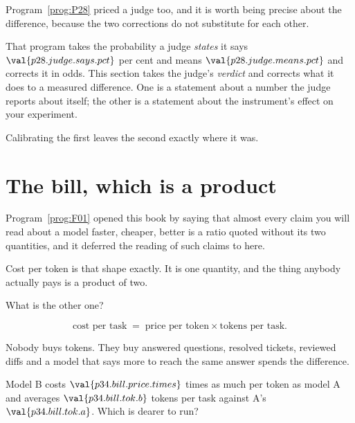 \begin{fr}
Program~\ref{prog:P28} priced a judge too, and it is worth being precise
about the difference, because the two corrections do not substitute for each
other.

That program takes the probability a judge \emph{states} \dash{} it says
$\val{p28.judge.says.pct}$ per cent and means $\val{p28.judge.means.pct}$
\dash{} and corrects it in odds. This section takes the judge's
\emph{verdict} and corrects what it does to a measured difference. One is a
statement about a number the judge reports about itself; the other is a
statement about the instrument's effect on your experiment.

Calibrating the first leaves the second exactly where it was.

\end{fr}

\section{The bill, which is a product}
\label{sec:P34-bill}

\begin{fr}
Program~\ref{prog:F01} opened this book by saying that almost every claim
you will read about a model \dash{} faster, cheaper, better \dash{} is a
ratio quoted without its two quantities, and it deferred the reading of such
claims to here.

Cost per token is that shape exactly. It is one quantity, and the thing
anybody actually pays is a product of two.

What is the other one?
\dotline
\nextframe
\end{fr}

\begin{fr}

\[ \text{cost per task} \;=\; \text{price per token} \times
   \text{tokens per task} . \]

Nobody buys tokens. They buy answered questions, resolved tickets, reviewed
diffs \dash{} and a model that says more to reach the same answer spends the
difference.

Model B costs $\val{p34.bill.price.times}$ times as much per token as model A
and averages $\val{p34.bill.tok.b}$ tokens per task against A's
$\val{p34.bill.tok.a}$. Which is dearer to run?
\dotline
\nextframe
\end{fr}

